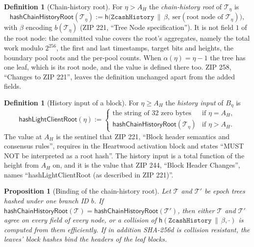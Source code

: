 \documentclass[11pt,a4paper]{article}
\newtheorem{proposition}[theorem]{Proposition}
\theoremstyle{definition}
\newtheorem{definition}[theorem]{Definition}
\begin{document}
\begin{definition}[Chain-history root]\label{def:history-root}
For $\eta > A_H$ the \emph{chain-history root} of $\mathcal{T}_\eta$ is
\[
  \mathsf{hashChainHistoryRoot}(\mathcal{T}_\eta) :=
  \mathsf{h}\bigl(\texttt{ZcashHistory} \,\|\, \beta,\
    \mathrm{ser}(\text{root node of } \mathcal{T}_\eta)\bigr),
\]
with $\beta$ encoding $b(\mathcal{T}_\eta)$ (ZIP 221, ``Tree Node
specification''). It is not field $1$ of the root node: the committed value
covers the root's aggregates, namely the total work modulo $2^{256}$, the
first and last timestamps, target bits and heights, the boundary pool roots
and the per-pool counts. When $\alpha(\eta) = \eta - 1$ the tree has one
leaf, which is its root node, and the value is defined there too. ZIP 258,
``Changes to ZIP 221'', leaves the definition unchanged apart from the added
fields.
\end{definition}

\begin{definition}[History input of a block]\label{def:history-input}
For $\eta \ge A_H$ the \emph{history input} of $B_\eta$ is
\[
  \mathsf{hashLightClientRoot}(\eta) :=
  \begin{cases}
    \text{the string of $32$ zero bytes} & \text{if } \eta = A_H, \\
    \mathsf{hashChainHistoryRoot}(\mathcal{T}_\eta) & \text{if } \eta > A_H.
  \end{cases}
\]
The value at $A_H$ is the sentinel that ZIP 221, ``Block header semantics
and consensus rules'', requires in the Heartwood activation block and states
``MUST NOT be interpreted as a root hash''. The history input is a total
function of the height from $A_H$ on, and it is the value that ZIP 244,
``Block Header Changes'', names ``hashLightClientRoot (as described in
ZIP 221)''.
\end{definition}

\begin{proposition}[Binding of the chain-history root]
\label{prop:history-binding}
Let $\mathcal{T}$ and $\mathcal{T}'$ be epoch trees hashed under one branch
ID $b$. If $\mathsf{hashChainHistoryRoot}(\mathcal{T}) =
\mathsf{hashChainHistoryRoot}(\mathcal{T}')$, then either $\mathcal{T}$ and
$\mathcal{T}'$ agree on every field of every node, or a collision of
$\mathsf{h}(\texttt{ZcashHistory} \,\|\, \beta, \cdot)$ is computed from them
efficiently. If in addition SHA-256d is collision resistant, the leaves'
block hashes bind the headers of the leaf blocks.
\end{proposition}
\end{document}
